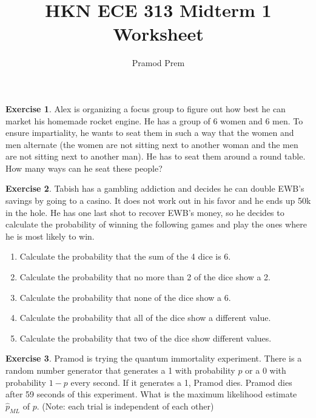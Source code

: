 \documentclass[12pt]{amsart}
\title{HKN ECE 313 Midterm 1 Worksheet}
\author{Pramod Prem}
\theoremstyle{definition}
\newtheorem{exercise}{Exercise}
\numberwithin{equation}{section}
\theoremstyle{plain}
\begin{document}
\maketitle

\begin{exercise}
\newline
Alex is organizing a focus group to figure out how best he can market his homemade rocket engine. He has a group of 6 women and 6 men. To ensure impartiality, he wants to seat them in such a way that the women and men alternate (the women are not sitting next to another woman and the men are not sitting next to another man). He has to seat them around a round table. How many ways can he seat these people?
\end{exercise}

\begin{exercise}
\newline
Tabish has a gambling addiction and decides he can double EWB's savings by going to a casino. It does not work out in his favor and he ends up 50k in the hole. He has one last shot to recover EWB's money, so he decides to calculate the probability of winning the following games and play the ones where he is most likely to win.
\begin{enumerate}[label=\Alph*.]
    \item Calculate the probability that the sum of the 4 dice is 6.
    \item Calculate the probability that no more than 2 of the dice show a 2.
    \item Calculate the probability that none of the dice show a 6.
    \item Calculate the probability that all of the dice show a different value.
    \item Calculate the probability that two of the dice show different values.
\end{enumerate}
\end{exercise}

\begin{exercise}
    Pramod is trying the quantum immortality experiment. There is a random number generator that generates a 1 with probability $p$ or a 0 with probability $1-p$ every second. If it generates a 1, Pramod dies. Pramod dies after 59 seconds of this experiment. What is the maximum likelihood estimate $\hat{p}_{ML}$ of $p$. (Note: each trial is independent of each other)
\end{exercise}
\end{document}
